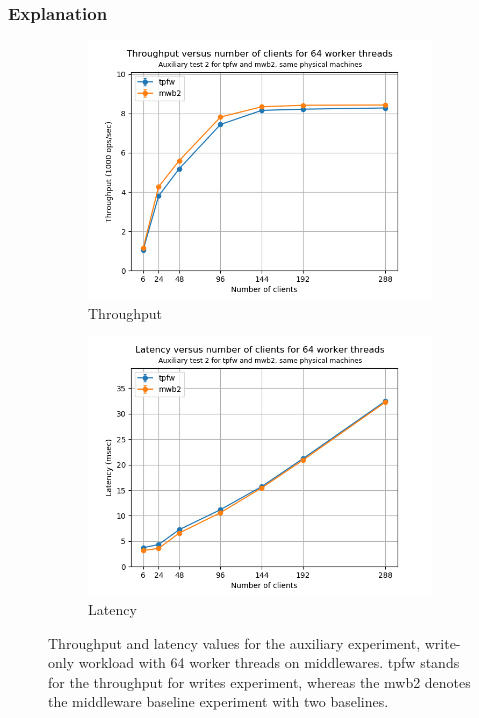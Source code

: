 \documentclass[11pt,a4paper]{article}
\begin{document}
\subsubsection{Explanation} \label{sec:tpfw-exp}
\begin{figure}[h]
\centering
\begin{subfigure}{.5\textwidth}
  \centering
  \includegraphics[width=1.0\linewidth,trim={0px 0px 0px 0px},clip]{img/plot/auxiliary-2-tp_mw.png}
  \caption{Throughput}
  \label{fig:auxiliary-2-tp_mw}
\end{subfigure}%
\begin{subfigure}{.5\textwidth}
  \centering
  \includegraphics[width=1.0\linewidth,trim={0px 0px 0px 0px},clip]{img/plot/auxiliary-2-lat_mw.png}
  \caption{Latency}
  \label{fig:auxiliary-2-lat_mw}
\end{subfigure}
\caption{Throughput and latency values for the auxiliary experiment, write-only workload with 64 worker threads on middlewares. tpfw stands for the throughput for writes experiment, whereas the mwb2 denotes the middleware baseline experiment with two baselines.}
\label{fig:auxiliary-2_mw}
\end{figure}
\end{document}
